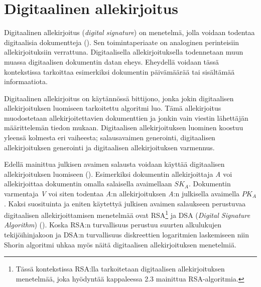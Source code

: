  \section{Digitaalinen allekirjoitus}
 Digitaalinen allekirjoitus (\emph{digital signature}) on menetelmä, jolla voidaan todentaa digitaalisia dokumentteja (\cite{1649003}). Sen toimintaperiaate on analoginen perinteisiin allekirjoituksiin verrattuna. Digitaalisella allekirjoituksella todennetaan muun muassa digitaalisen dokumentin datan eheys. Eheydellä voidaan tässä kontekstissa tarkoittaa esimerkiksi dokumentin päivämäärää tai sisältämää informaatiota.
 
 Digitaalinen allekirjoitus on käytännössä bittijono, jonka jokin digitaalisen allekirjoituksen luomiseen tarkoitettu algoritmi luo. Tämä allekirjoitus muodostetaan allekirjoitettavien dokumenttien ja jonkin vain viestin lähettäjän määrittelemän tiedon mukaan. Digitaalisen allekirjoituksen luominen koostuu yleensä kolmesta eri vaiheesta; salausavaimen generointi, digitaalisen allekirjoituksen generointi ja digitaalisen allekirjoituksen varmennus.
 
 Edellä mainittua julkisen avaimen salausta voidaan käyttää digitaalisen allekirjoituksen luomiseen (\cite{mavroeidis2018impact}). Esimerkiksi dokumentin allekirjoittaja \emph{A} voi allekirjoittaa dokumentin omalla salaisella avaimellaan $SK_{A}$. Dokumentin varmentaja \emph{V} voi siten todentaa \emph{A}:n allekirjoituksen \emph{A}:n julkisella avaimella $PK_{A}$. Kaksi suosituinta ja eniten käytettyä julkisen avaimen salaukseen perustuvaa digitaalisen allekirjoittamisen menetelmää ovat RSA\footnote{Tässä kontekstissa RSA:lla tarkoitetaan digitaalisen allekirjoituksen menetelmää, joka hyödyntää kappaleessa 2.3 mainittua RSA-algoritmia.} ja DSA (\emph{Digital Signature Algorithm}) (\cite{1649003}). Koska RSA:n turvallisuus perustuu suurten alkulukujen tekijöihinjakoon ja DSA:n turvallisuus diskreettien logaritmien laskemiseen niin Shorin algoritmi uhkaa myös näitä digitaalisen allekirjoituksen menetelmiä.